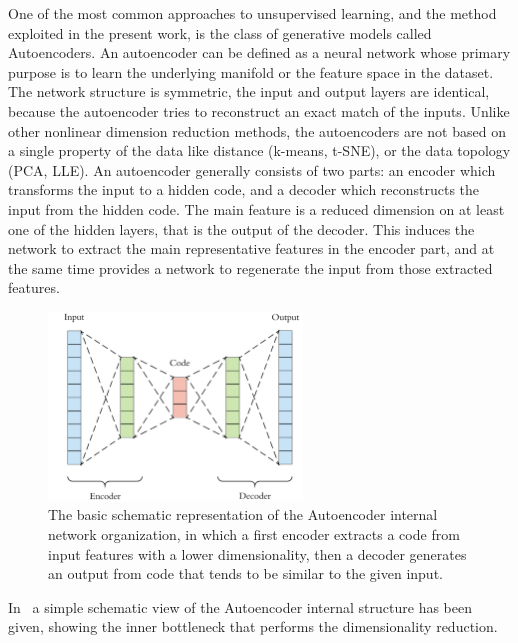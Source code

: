 One of the most common approaches to unsupervised learning, and the method exploited in the present work, is the class of generative models called Autoencoders.
An autoencoder can be defined as a neural network whose primary purpose is to learn the underlying manifold or the feature space in the dataset. The network structure is symmetric, the input and output layers are identical, because the autoencoder tries to reconstruct an exact match of the inputs. Unlike other nonlinear dimension reduction methods, the autoencoders are not based on a single property of the data like distance (k-means, t-SNE), or the data topology (PCA, LLE). An autoencoder generally consists of two parts: an encoder which transforms the input to a hidden code, and a decoder which reconstructs the input from the hidden code. The main feature is a reduced dimension on at least one of the hidden layers, that is the output of the decoder. This induces the network to extract the main representative features in the encoder part, and at the same time provides a network to regenerate the input from those extracted features.
\begin{figure}[h]
    \centering
    \includegraphics[height=5cm]{img/3_ML/Autoencoder.png}
    \caption{The basic schematic representation of the Autoencoder internal network organization, in which a first encoder extracts a code from input features with a lower dimensionality, then a decoder generates an output from code that tends to be similar to the given input. }
    \label{fig:autoencoder}
\end{figure}
In~\Figure{\ref{fig:autoencoder}} a simple schematic view of the Autoencoder internal structure has been given, showing the inner bottleneck that performs the dimensionality reduction.



